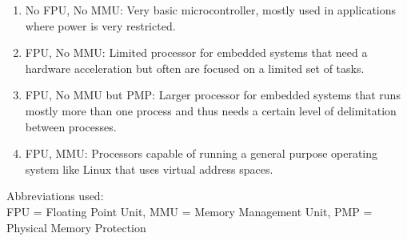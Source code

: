 \begin{enumerate}
    \item No FPU, No MMU: Very basic microcontroller, mostly used
    in applications where power is very restricted.
    \item FPU, No MMU: Limited processor for embedded systems that
    need a hardware acceleration but often are focused on a limited
    set of tasks.
    \item FPU, No MMU but PMP: Larger processor for embedded systems
    that runs mostly more than one process and thus needs a certain
    level of delimitation between processes.
    \item FPU, MMU: Processors capable of running a general purpose
    operating system like Linux that uses virtual address spaces.
\end{enumerate}
Abbreviations used:\\
FPU = Floating Point Unit, MMU = Memory Management Unit, 
PMP = Physical Memory Protection


